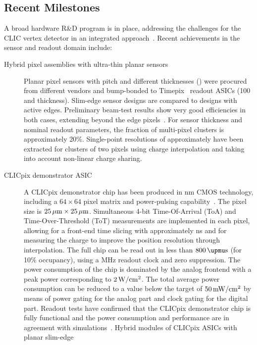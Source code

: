 \subsection{Recent Milestones}
A broad hardware R\&D program is in place, addressing the challenges for the CLIC
vertex detector in an integrated approach~\cite{1748-0221-10-03-C03025}. Recent achievements
in the sensor and readout domain include:
\begin{description}
\item[Hybrid pixel assemblies with ultra-thin planar sensors]
Planar pixel sensors with \unit[55]{\micron} pitch and different thicknesses (\unit[50--300]{\micron})
were procured from different vendors and bump-bonded to Timepix~\cite{Llopart2007485} readout
ASICs (100 and \unit[700]{\micron} thickness).
Slim-edge sensor designs are compared to designs
with active edges.
Preliminary beam-test results show very good efficiencies in both cases, extending beyond the
edge pixels~\cite{Redford:1966932}.
For \unit[50]{\micron} sensor thickness and nominal readout parameters, the fraction of multi-pixel clusters
is approximately 20\%.
Single-point resolutions of approximately \unit[3]{\micron} have been extracted
for clusters of two pixels using charge interpolation and taking into account
non-linear charge sharing.
\item[CLICpix demonstrator ASIC]
A CLICpix demonstrator chip has been produced in \unit[65]{nm} CMOS technology,
including a $64 \times 64$ pixel matrix and power-pulsing capability~\cite{Valerio:1507691}.
The pixel size is $\unit[25]{\micron}\times\unit[25]{\micron}$. Simultaneous
4-bit Time-Of-Arrival (ToA) and Time-Over-Threshold (ToT) measurements
are implemented in each pixel, allowing for a front-end time slicing
with approximately \unit[10]{ns} and for measuring the charge
to improve the position resolution through interpolation.
The full chip can be read out in less than
$\unit[800]{\upmu s}$ (for 10\% occupancy), using a \unit[320]{MHz} readout clock and zero suppression.
The
power consumption of the chip is dominated by the analog frontend
with a peak power corresponding to $\unit[2]{W/cm^2}$. The total average power
consumption can be reduced to a value below the target of $\unit[50]{mW/cm^2}$
by means of power gating for the analog part and clock gating for the digital part.
Readout tests have confirmed that the CLICpix demonstrator chip
is fully functional and the power consumption and performance are in agreement with
simulations~\cite{clicpix-twepp-2013}.
Hybrid modules of CLICpix ASICs with planar slim-edge

\end{description}
